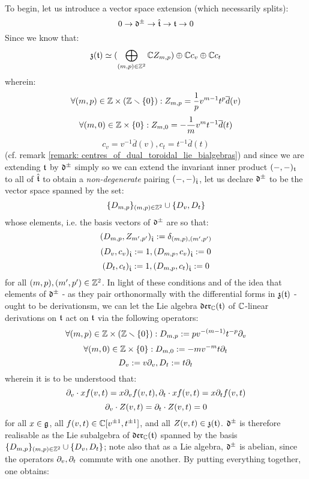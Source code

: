 \begin{remark}
                To begin, let us introduce a vector space extension (which necessarily splits):
                    $$0 \to \mathfrak{d}^{\pm} \to \hat{\mathfrak{t}} \to \mathfrak{t} \to 0$$
                Since we know that:
                    $$\mathfrak{z}(\mathfrak{t}) \simeq ( \bigoplus_{(m, p) \in \mathbb{Z}^2} \mathbb{C} Z_{m, p}) \oplus \mathbb{C} c_v \oplus \mathbb{C} c_t$$
                wherein:
                    $$\forall (m, p) \in \Z \x (\Z \setminus \{0\}): Z_{m, p} = \frac1p v^{m - 1} t^p \overline{d}(v)$$
                    $$\forall (m, 0) \in \Z \x \{0\}: Z_{m, 0} = -\frac1m v^m t^{-1} \overline{d}(t)$$
                    $$c_v = v^{-1} \overline{d}(v), c_t = t^{-1} \overline{d}(t)$$
                (cf. remark \ref{remark: centres_of_dual_toroidal_lie_bialgebras}) and since we are extending $\mathfrak{t}$ by $\mathfrak{d}^{\pm}$ simply so we can extend the invariant inner product $(-, -)_{\mathfrak{t}}$ to all of $\hat{\mathfrak{t}}$ to obtain a \textit{non-degenerate} pairing $(-, -)_{\hat{\mathfrak{t}}}$, let us declare $\mathfrak{d}^{\pm}$ to be the vector space spanned by the set:
                    $$\{ D_{m, p} \}_{(m, p) \in \mathbb{Z}^2} \cup \{D_v, D_t\}$$
                whose elements, i.e. the basis vectors of $\mathfrak{d}^{\pm}$ are so that:
                    $$( D_{m, p}, Z_{m', p'} )_{\hat{\mathfrak{t}}} := \delta_{(m, p), (m', p')}$$
                    $$(D_v, c_v)_{\hat{\mathfrak{t}}} := 1, (D_{m, p}, c_v)_{\hat{\mathfrak{t}}} := 0$$
                    $$(D_t, c_t)_{\hat{\mathfrak{t}}} := 1, (D_{m, p}, c_t)_{\hat{\mathfrak{t}}} := 0$$
                for all $(m, p), (m', p') \in \mathbb{Z}^2$. In light of these conditions and of the idea that elements of $\mathfrak{d}^{\pm}$ - as they pair orthonormally with the differential forms in $\mathfrak{z}(\mathfrak{t})$ - ought to be derivationsm, we can let the Lie algebra $\mathfrak{der}_{\mathbb{C}}(\mathfrak{t})$ of $\mathbb{C}$-linear derivations on $\mathfrak{t}$ act on $\mathfrak{t}$ via the following operators:
                    $$\forall (m, p) \in \Z \x (\Z \setminus \{0\}): D_{m, p} := p v^{-(m - 1)} t^{-p} \del_v$$
                    $$\forall (m, 0) \in \Z \x \{0\}: D_{m, 0} := -m v^{-m} t \del_t$$
                    $$D_v := v \partial_v, D_t := t \partial_t$$
                wherein it is to be understood that:
                    $$\partial_v \cdot x f(v, t) = x \partial_v f(v, t), \partial_t \cdot x f(v, t) = x \partial_t f(v, t)$$
                    $$\partial_v \cdot Z(v, t) = \partial_t \cdot Z(v, t) = 0$$
                for all $x \in \mathfrak{g}$, all $f(v, t) \in \mathbb{C}[v^{\pm 1}, t^{\pm 1}]$, and all $Z(v, t) \in \mathfrak{z}(\mathfrak{t})$. $\mathfrak{d}^{\pm}$ is therefore realisable as the Lie subalgebra of $\mathfrak{der}_{\mathbb{C}}(\mathfrak{t})$ spanned by the basis $\{ D_{m, p} \}_{(m, p) \in \mathbb{Z}^2} \cup \{D_v, D_t\}$; note also that as a Lie algebra, $\mathfrak{d}^{\pm}$ is abelian, since the operators $\partial_v, \partial_t$ commute with one another. By putting everything together, one obtains:

\end{remark}
